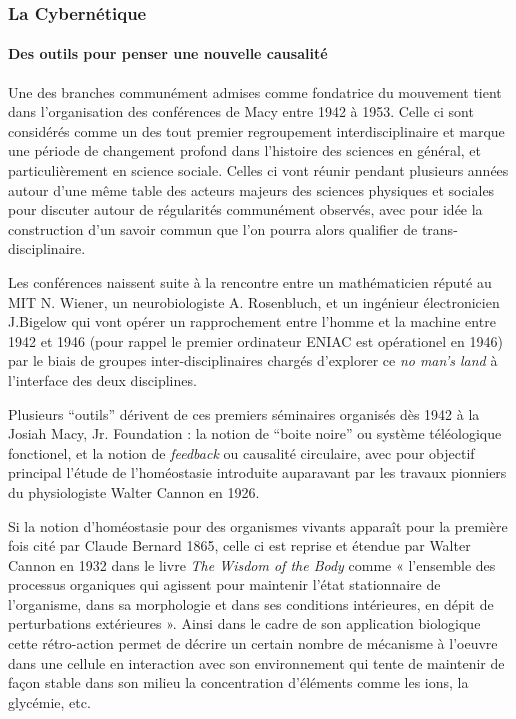 \subsubsection{La Cybernétique}
\label{ssubsec:cybernetic}

\paragraph{Des outils pour penser une nouvelle causalité}

Une des branches communément admises comme fondatrice du mouvement tient dans l'organisation des conférences de Macy entre 1942 à 1953. Celle ci sont considérés comme un des tout premier regroupement interdisciplinaire et marque une période de changement profond dans l'histoire des sciences en général, et particulièrement en science sociale. Celles ci vont réunir pendant plusieurs années autour d'une même table des acteurs majeurs des sciences physiques et sociales pour discuter autour de régularités communément observés, avec pour idée la construction d'un savoir commun que l'on pourra alors qualifier de trans-disciplinaire. 

Les conférences naissent suite à la rencontre entre un mathématicien réputé au MIT N. Wiener, un neurobiologiste A. Rosenbluch, et un ingénieur électronicien J.Bigelow qui vont opérer un rapprochement entre l'homme et la machine entre 1942 et 1946 (pour rappel le premier ordinateur ENIAC est opérationel en 1946) par le biais de groupes inter-disciplinaires chargés d'explorer ce \textit{no man's land} à l'interface des deux disciplines. 

Plusieurs \enquote{outils} dérivent de ces premiers séminaires organisés dès 1942 à la Josiah Macy, Jr. Foundation : la notion de \enquote{boite noire} ou système téléologique fonctionel, et la notion de \textit{feedback} ou causalité circulaire, avec pour objectif principal l'étude de l'homéostasie introduite auparavant par les travaux pionniers du physiologiste Walter Cannon en 1926.

Si la notion d'homéostasie pour des organismes vivants apparaît pour la première fois cité par Claude Bernard 1865, celle ci est reprise et étendue par Walter Cannon en 1932 dans le livre \textit{The Wisdom of the Body} \autocite{Cannon1932} comme « l’ensemble des processus organiques qui agissent pour maintenir l’état stationnaire de l’organisme, dans sa morphologie et dans ses conditions intérieures, en dépit de perturbations extérieures ». Ainsi dans le cadre de son application biologique cette rétro-action permet de décrire un certain nombre de mécanisme à l'oeuvre dans une cellule en interaction avec son environnement qui tente de maintenir de façon stable dans son milieu la concentration d'éléments comme les ions, la glycémie, etc.

